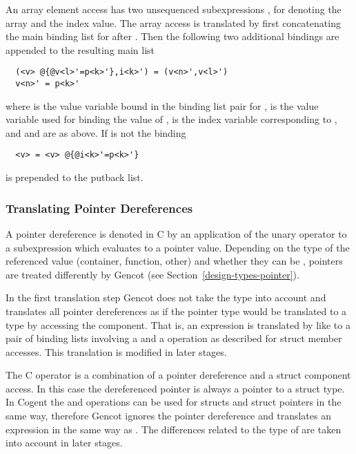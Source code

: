 An array element access  has two unsequenced subexpressions ,  for denoting the array and the index value.
The array access is translated by first concatenating the main binding list for  after . Then the following two additional 
bindings are appended to the resulting main list
\begin{verbatim}
  (<v> @{@v<l>'=p<k>'},i<k>') = (v<n>',v<l>')
  v<n>' = p<k>'
\end{verbatim}
where  is the value variable bound in the binding list pair for ,  is the value variable used for
binding the value of ,  is the index variable corresponding to , and  and  
are as above. If  is not \code{\_} the binding
\begin{verbatim}
  <v> = <v> @{@i<k>'=p<k>'}
\end{verbatim}
is prepended to the putback list.

\subsubsection{Translating Pointer Dereferences}

A pointer dereference is denoted in C by an application of the unary operator \code{*} to a subexpression which evaluates to
a pointer value. Depending on the type of the referenced value (container, function, other) and whether they can be , 
pointers are treated differently by Gencot (see Section~\ref{design-types-pointer}). 

In the first translation step Gencot does not take the type into account and translates all pointer dereferences as if the 
pointer type would be translated to a type  by accessing the  component. That is, an expression
 is translated by  like  to a pair of binding lists involving a  and a 
operation as described for struct member accesses. This translation is modified in later stages.

The C operator \code{->} is a combination of a pointer dereference and a struct component access. In this case the dereferenced 
pointer is always a pointer to a struct type. In Cogent the  and  operations can be used for structs and
struct pointers in the same way, therefore Gencot ignores the pointer dereference and translates an expression 
in the same way as . The differences related to the type of  are taken into account in later stages.

